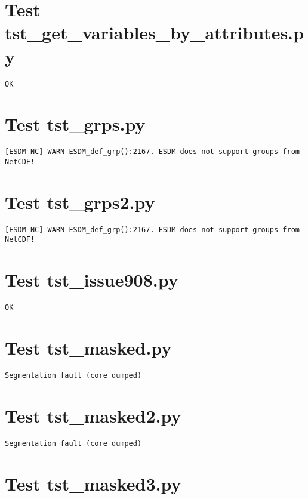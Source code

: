 \section{Test tst\_get\_variables\_by\_attributes.py}

\begin{verbatim}
OK
\end{verbatim}

\section{Test tst\_grps.py}

\begin{verbatim}
[ESDM NC] WARN ESDM_def_grp():2167. ESDM does not support groups from NetCDF!
\end{verbatim}

\section{Test tst\_grps2.py}

\begin{verbatim}
[ESDM NC] WARN ESDM_def_grp():2167. ESDM does not support groups from NetCDF!
\end{verbatim}

\section{Test tst\_issue908.py}

\begin{verbatim}
OK
\end{verbatim}

\section{Test tst\_masked.py}

\begin{verbatim}
Segmentation fault (core dumped)
\end{verbatim}

\section{Test tst\_masked2.py}

\begin{verbatim}
Segmentation fault (core dumped)
\end{verbatim}

\section{Test tst\_masked3.py}

